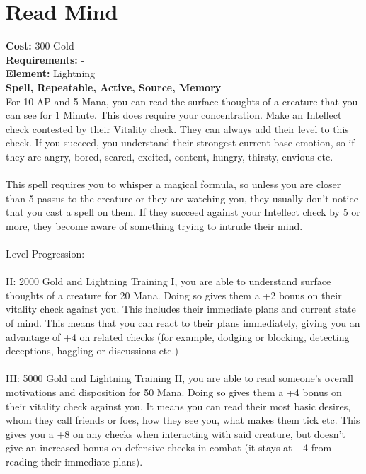 \section{Read Mind}
\textbf{Cost:} 300 Gold\\
\textbf{Requirements:} -\\
\textbf{Element:} Lightning\\
\textbf{Spell, Repeatable, Active, Source, Memory}\\
For 10 AP and 5 Mana, you can read the surface thoughts of a creature that you can see for 1 Minute. This does require your concentration. Make an Intellect check contested by their Vitality check. They can always add their level to this check. If you succeed, you understand their strongest current base emotion, so if they are angry, bored, scared, excited, content, hungry, thirsty, envious etc.\\
\\
This spell requires you to whisper a magical formula, so unless you are closer than 5 passus to the creature or they are watching you, they usually don't notice that you cast a spell on them. If they succeed against your Intellect check by 5 or more, they become aware of something trying to intrude their mind.\\
\\
Level Progression:\\
\\
II: 2000 Gold and Lightning Training I, you are able to understand surface thoughts of a creature for 20 Mana. Doing so gives them a +2 bonus on their vitality check against you. This includes their immediate plans and current state of mind. This means that you can react to their plans immediately, giving you an advantage of +4 on related checks (for example, dodging or blocking, detecting deceptions, haggling or discussions etc.)\\
\\
III: 5000 Gold and Lightning Training II, you are able to read someone's overall motivations and disposition for 50 Mana. Doing so gives them a +4 bonus on their vitality check against you. It means you can read their most basic desires, whom they call friends or foes, how they see you, what makes them tick etc. This gives you a +8 on any checks when interacting with said creature, but doesn't give an increased bonus on defensive checks in combat (it stays at +4 from reading their immediate plans).\\